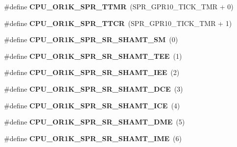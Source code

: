 \begin{DoxyCompactItemize}
\#define {\bfseries C\+P\+U\+\_\+\+O\+R1\+K\+\_\+\+S\+P\+R\+\_\+\+T\+T\+MR}~(S\+P\+R\+\_\+\+G\+P\+R10\+\_\+\+T\+I\+C\+K\+\_\+\+T\+MR + 0)
\item 
\mbox{\label{or1k-utility_8h_a156454263e6a9e59e0b99c6a44d8e19e}} 
\#define {\bfseries C\+P\+U\+\_\+\+O\+R1\+K\+\_\+\+S\+P\+R\+\_\+\+T\+T\+CR}~(S\+P\+R\+\_\+\+G\+P\+R10\+\_\+\+T\+I\+C\+K\+\_\+\+T\+MR + 1)
\item 
\mbox{\label{or1k-utility_8h_a8a098ef70380c74d63d45ecacad178c6}} 
\#define {\bfseries C\+P\+U\+\_\+\+O\+R1\+K\+\_\+\+S\+P\+R\+\_\+\+S\+R\+\_\+\+S\+H\+A\+M\+T\+\_\+\+SM}~(0)
\item 
\mbox{\label{or1k-utility_8h_a7d89a8cb0e7342bc83086c65417b7909}} 
\#define {\bfseries C\+P\+U\+\_\+\+O\+R1\+K\+\_\+\+S\+P\+R\+\_\+\+S\+R\+\_\+\+S\+H\+A\+M\+T\+\_\+\+T\+EE}~(1)
\item 
\mbox{\label{or1k-utility_8h_a0478a3894f9f6d4c5c2aeb815111b253}} 
\#define {\bfseries C\+P\+U\+\_\+\+O\+R1\+K\+\_\+\+S\+P\+R\+\_\+\+S\+R\+\_\+\+S\+H\+A\+M\+T\+\_\+\+I\+EE}~(2)
\item 
\mbox{\label{or1k-utility_8h_a7f3fba62451583ccdf518415b13676de}} 
\#define {\bfseries C\+P\+U\+\_\+\+O\+R1\+K\+\_\+\+S\+P\+R\+\_\+\+S\+R\+\_\+\+S\+H\+A\+M\+T\+\_\+\+D\+CE}~(3)
\item 
\mbox{\label{or1k-utility_8h_a2bd264b297ff0f5ea3f0e0b46e9328eb}} 
\#define {\bfseries C\+P\+U\+\_\+\+O\+R1\+K\+\_\+\+S\+P\+R\+\_\+\+S\+R\+\_\+\+S\+H\+A\+M\+T\+\_\+\+I\+CE}~(4)
\item 
\mbox{\label{or1k-utility_8h_a2127b55c2e1291d6e4300d08074a2fcc}} 
\#define {\bfseries C\+P\+U\+\_\+\+O\+R1\+K\+\_\+\+S\+P\+R\+\_\+\+S\+R\+\_\+\+S\+H\+A\+M\+T\+\_\+\+D\+ME}~(5)
\item 
\mbox{\label{or1k-utility_8h_a539ff1c736c69a19e97af9373e5b0167}} 
\#define {\bfseries C\+P\+U\+\_\+\+O\+R1\+K\+\_\+\+S\+P\+R\+\_\+\+S\+R\+\_\+\+S\+H\+A\+M\+T\+\_\+\+I\+ME}~(6)
\item 
\mbox{\label{or1k-utility_8h_a9dc9ba5d123c3380e3c7756ef3e5aef4}} 

\end{DoxyCompactItemize}
